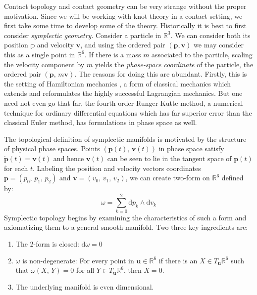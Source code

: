 Contact topology and contact geometry can be very strange without the
proper motivation. Since we will be working with knot theory in a contact
setting, we first take some time to develop some of the theory. Historically it
is best to first consider \textit{symplectic geometry}. Consider a particle
in $\mathbb{R}^{3}$. We can consider both its position $\mathbb{p}$ and
velocity $\mathbf{v}$, and using the ordered pair $(\mathbf{p},\mathbf{v})$
we may consider this as a single point in $\mathbb{R}^{6}$. If there is a mass
$m$ associated to the particle, scaling the velocity component by $m$ yields
the \textit{phase-space coordinate} of the particle, the ordered pair
$(\mathbf{p},\,m\mathbf{v})$. The reasons for doing this are abundant. Firstly,
this is the setting of Hamiltonian mechanics
\cite{HamiltonMechanics1833}, a form of classical mechanics which extends and
reformulates the highly successful Lagrangian mechanics. But one need not even
go that far, the fourth order Runger-Kutte method, a numerical technique for
ordinary differential equations which has far superior error than the classical
Euler method, has formulations in phase space as well.
\par\hfill\par
The topological definition of symplectic manifolds is motivated by the
structure of physical phase spaces. Points $(\mathbf{p}(t),\,\mathbf{v}(t))$ in
phase space satisfy $\dot{\mathbf{p}}(t)=\mathbf{v}(t)$ and hence
$\mathbf{v}(t)$ can be seen to lie in the tangent space of $\mathbf{p}(t)$ for
each $t$. Labeling the position and velocity vectors
coordinates $\mathbf{p}=(p_{0},\,p_{1},\,p_{2})$ and
$\mathbf{v}=(v_{0},\,v_{1},\,v_{2})$, we can create two-form on
$\mathbb{R}^{6}$ defined by:
\begin{equation}
    \omega=\sum_{k=0}^{2}\textrm{d}p_{k}\land\textrm{d}v_{k}
\end{equation}
Symplectic topology begins by examining the characteristics of such a form
and axiomatizing them to a general smooth manifold. Two three key ingredients
are:
\begin{enumerate}
    \item The 2-form is closed: $\textrm{d}\omega=0$
    \item $\omega$ is non-degenerate: For every point in
        $\mathbf{u}\in\mathbb{R}^{6}$ if there is an
        $X\in{T}_{\mathbf{u}}\mathbb{R}^{6}$ such that
        $\omega(X,\,Y)=0$ for all $Y\in{T}_{\mathbf{u}}\mathbb{R}^{6}$, then
        $X=0$.
    \item The underlying manifold is even dimensional.
\end{enumerate}
